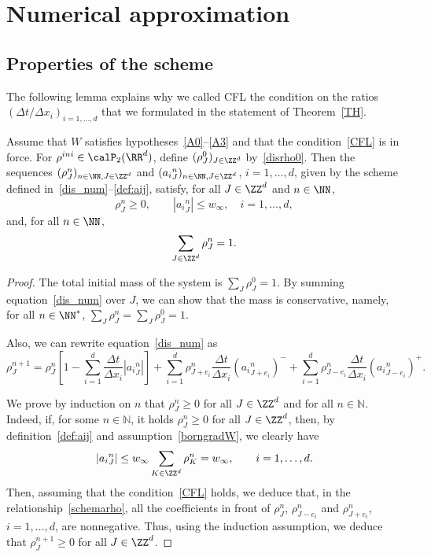 \section{Numerical approximation}\label{sec:num}


\subsection{Properties of the scheme}

The following lemma explains why we called CFL the condition on the ratios $(\Delta t/\Delta x_{i})_{i=1,\dots,d}$ that we formulated in the statement of Theorem~\ref{TH}.

\begin{lemm}\label{lem:CFL}
Assume that $W$ satisfies hypotheses~\eqref{A0}--\eqref{A3} and that the condition~\eqref{CFL} is in force. For $\rho^{ini}\in \calP_2(\RR^d)$, define $(\rho_{J}^0)_{J \in \ZZ^d}$ by~\eqref{disrho0}. Then the sequences $(\rho_J^n)_{n \in \NN,J \in \ZZ^d}$ and $({a_i}_J^n)_{n \in \NN,J \in \ZZ^d}$, $i=1,\ldots,d$, given by the scheme defined in~\eqref{dis_num}--\eqref{def:aij}, satisfy, for all $J\in \ZZ^d$ and $n\in \NN$,
\[
\rho_{J}^n \geq 0, \qquad |{a_i}_{J}^n|\leq w_\infty, \quad i=1,\ldots, d,
\]
and, for all $n \in \NN$,
\begin{equation*}
\sum_{J \in \ZZ^d} \rho_{J}^n=1.
\end{equation*}
\end{lemm}

\begin{proof}
The total initial mass of the system is $\sum_{J} \rho_{J}^0=1$. By summing equation~\eqref{dis_num} over $J$, we can show that the mass is conservative, namely, for all $n\in \NN^*$, $\sum_{J} \rho_{J}^n=
\sum_{J} \rho_{J}^0=1$.

Also, we can rewrite equation~\eqref{dis_num} as
\begin{equation}
\rho_{J}^{n+1} = \rho_{J}^n \left[1 - \sum_{i=1}^d \frac{\Delta t}{\Delta x_i} |{a_i}^n_{J}| \right] + \sum_{i=1}^d \rho_{J+e_i}^n \frac{\Delta t}{\Delta x_i}({a_i}^n_{J+e_i})^- + \sum_{i=1}^d \rho_{J-e_i}^n \frac{\Delta t}{\Delta x_i}({a_i}^n_{J-e_i})^+.\label{schemarho}
\end{equation}

We prove by induction on $n$ that $\rho_{J}^n \geq 0$ for all $J \in \ZZ^d$ and for all $n \in {\mathbb N}$. Indeed, if, for some $n \in {\mathbb N}$, it holds $\rho_{J}^n \geq 0$ for all $J \in \ZZ^d$, then, by definition~\eqref{def:aij} and assumption~\eqref{borngradW}, we clearly have
\[
|{a_i}_{J}^{n}|\leq w_\infty \sum_{K\in \ZZ^d} \rho_{K}^n = w_\infty, \qquad i=1,\ldots,d.
\]
Then, assuming that the condition~\eqref{CFL} holds, we deduce that, in the relationship~\eqref{schemarho}, all the coefficients in front of $\rho_{J}^n$, $\rho_{J-e_i}^n$ and $\rho_{J+e_i}^n$, $i=1,\ldots,d$, are nonnegative. Thus, using the induction assumption, we deduce that $\rho_{J}^{n+1}\geq 0$ for all $J\in \ZZ^d$.
\end{proof}

